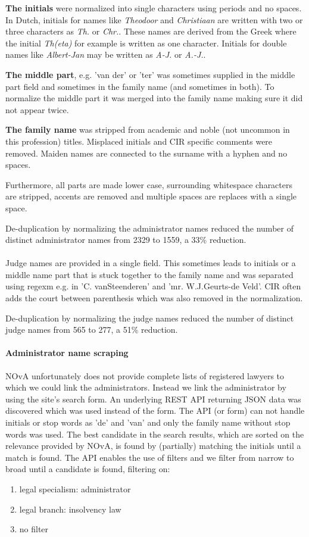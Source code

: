 \textbf{The initials} were normalized into single characters using periods and no spaces. In Dutch, initials for names like \textit{Theodoor} and \textit{Christiaan} are written with two or three characters as \textit{Th.} or \textit{Chr.}. These names are derived from the Greek where the initial \textit{Th(eta)} for example is written as one character. Initials for double names like \textit{Albert-Jan} may be written as \textit{A-J.} or \textit{A.-J.}. 

\textbf{The middle part}, e.g. 'van der' or 'ter' was sometimes supplied in the middle part field and sometimes in the family name (and sometimes in both). To normalize the middle part it was merged into the family name making sure it did not appear twice.

\textbf{The family name} was stripped from academic and noble (not uncommon in this profession) titles. Misplaced initials and CIR specific comments were removed. Maiden names are connected to the surname with a hyphen and no spaces.

Furthermore, all parts are made lower case, surrounding whitespace characters are stripped, accents are removed and multiple spaces are replaces with a single space. 

De-duplication by normalizing the administrator names reduced the number of distinct administrator names from 2329 to 1559, a 33\% reduction.
\\\\
Judge names are provided in a single field. This sometimes leads to initials or a middle name part that is stuck together to the family name and was separated using regexm e.g. in 'C. vanSteenderen' and 'mr. W.J.Geurts-de Veld'. CIR often adds the court between parenthesis which was also removed in the normalization.

De-duplication by normalizing the judge names reduced the number of distinct judge names from 565 to 277, a 51\% reduction.

\paragraph{Administrator name scraping}
NOvA unfortunately does not provide complete lists of registered lawyers to which we could link the administrators. Instead we link the administrator by using the site's search form. An underlying REST API returning JSON data was discovered which was used instead of the form. The API (or form) can not handle initials or stop words as 'de' and 'van' and only the family name without stop words was used. The best candidate in the search results, which are sorted on the relevance provided by NOvA, is found by (partially) matching the initials until a match is found. The API enables the use of filters and we filter from narrow to broad until a candidate is found, filtering on: 
\begin{enumerate}
\item{legal specialism: administrator}
\item{legal branch: insolvency law}
\item{no filter}
\end{enumerate}

